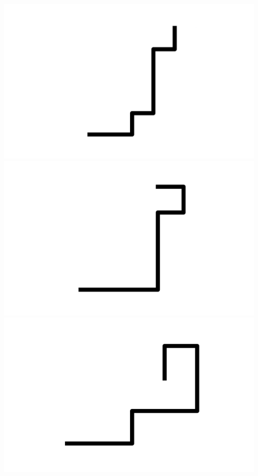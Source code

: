 \documentclass[]{report}
\begin{document}
\includegraphics[scale=.1]{pictures/21/state_cluster_shapes_265.pdf} 
\includegraphics[scale=.1]{pictures/21/state_cluster_shapes_266.pdf} 
\includegraphics[scale=.1]{pictures/21/state_cluster_shapes_267.pdf} 
\end{document}
